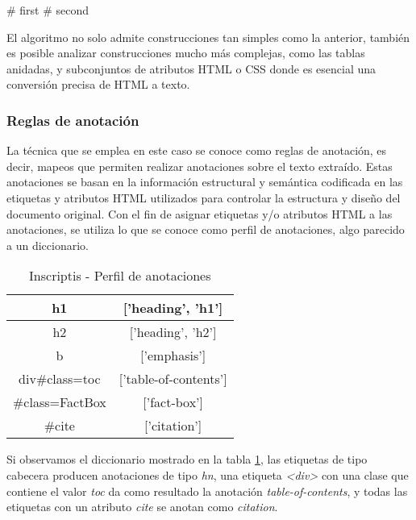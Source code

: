 \begin{Schunk}
  \begin{Soutput}
    # first
    # second
  \end{Soutput}
\end{Schunk}

El algoritmo no solo admite construcciones tan simples como la anterior, también es posible analizar 
construcciones mucho más complejas, como las tablas anidadas, y subconjuntos de atributos HTML o CSS donde 
es esencial una conversión precisa de HTML a texto.

\subsubsection{Reglas de anotación}
\label{subsubsec:reglas de anotacion}

La técnica que se emplea en este caso se conoce como reglas de anotación, es decir, mapeos que permiten 
realizar anotaciones sobre el texto extraído. Estas anotaciones se basan en la información estructural y 
semántica codificada en las etiquetas y atributos HTML utilizados para controlar la estructura y diseño 
del documento original. Con el fin de asignar etiquetas y/o atributos HTML a las anotaciones, se utiliza 
lo que se conoce como perfil de anotaciones, algo parecido a un diccionario. 


\begin{table}[h]
  \begin{center}
  \begin{tabular}{| c | c |} \hline 
    h1 & ['heading', 'h1'] \\ \hline
    h2 & ['heading', 'h2'] \\ \hline
    b & ['emphasis'] \\ \hline
    div\#class=toc & ['table-of-contents'] \\ \hline
    \#class=FactBox & ['fact-box'] \\ \hline
    \#cite & ['citation'] \\ \hline
  \end{tabular}
  \caption{Inscriptis - Perfil de anotaciones}
  \label{tab:inscriptis - perfil de anotaciones}
  \end{center}
\end{table}

Si observamos el diccionario mostrado en la tabla \ref{tab:inscriptis - perfil de anotaciones}, las 
etiquetas de tipo cabecera producen anotaciones de tipo \emph{hn}, una etiqueta \emph{<div>} con una 
clase que contiene el valor \emph{toc} da como resultado la anotación \emph{table-of-contents}, y todas 
las etiquetas con un atributo \emph{cite} se anotan como \emph{citation}.

